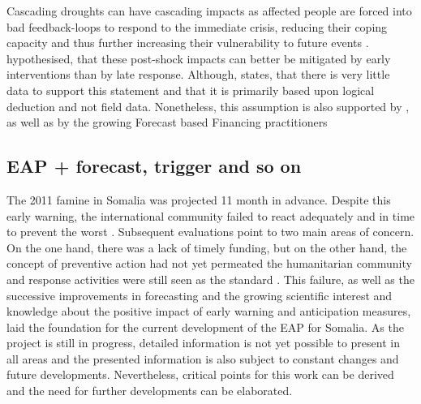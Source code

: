 Cascading droughts can have cascading impacts as affected people are forced into bad feedback-loops to respond to the immediate crisis, reducing their coping capacity and thus further increasing their vulnerability to future events \autocite{usaidEconomicsResilienceDrought2018}. \autocite{usaidEconomicsResilienceDrought2018} hypothesised, that these post-shock impacts can better be mitigated by early interventions than by late response. Although, \autocite{usaidEconomicsResilienceDrought2018} states, that there is very little data to support this statement and that it is primarily based upon logical deduction and not field data. Nonetheless, this assumption is also supported by \autocite{aliMitigatingNaturalDisasters2017a}, \autocite{abdulkadirAssessmentDroughtRecurrence2017} as well as by the growing Forecast based Financing practitioners \autocite{gualazziniEWEAEarlyWarning2021, harrowsmithFutureForecastImpact2020}

\subsection{EAP + forecast, trigger and so on}

The 2011 famine in Somalia was projected 11 month in advance. Despite this early warning, the international community failed to react adequately and in time to prevent the worst \autocite{elisabethstephensFORECASTBASEDACTION2015, hillbrunerWhenEarlyWarning2012}. Subsequent evaluations point to two main areas of concern. On the one hand, there was a lack of timely funding, but on the other hand, the concept of preventive action had not yet permeated the humanitarian community and response activities were still seen as the standard \autocite{elisabethstephensFORECASTBASEDACTION2015}. This failure, as well as the successive improvements in forecasting and the growing scientific interest and knowledge about the positive impact of early warning and anticipation measures, laid the foundation for the current development of the EAP for Somalia. As the project is still in progress, detailed information is not yet possible to present in all areas and the presented information is also subject to constant changes and future developments. Nevertheless, critical points for this work can be derived and the need for further developments can be elaborated.

